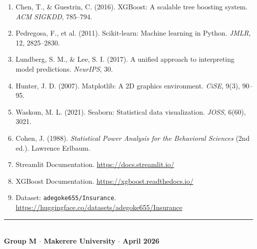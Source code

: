 \documentclass[12pt,a4paper]{report}
\begin{document}
\begin{enumerate}
  \item Chen, T., \& Guestrin, C. (2016). XGBoost: A scalable tree boosting system. \textit{ACM SIGKDD}, 785--794.
  \item Pedregosa, F., et al. (2011). Scikit-learn: Machine learning in Python. \textit{JMLR}, 12, 2825--2830.
  \item Lundberg, S. M., \& Lee, S. I. (2017). A unified approach to interpreting model predictions. \textit{NeurIPS}, 30.
  \item Hunter, J. D. (2007). Matplotlib: A 2D graphics environment. \textit{CiSE}, 9(3), 90--95.
  \item Waskom, M. L. (2021). Seaborn: Statistical data visualization. \textit{JOSS}, 6(60), 3021.
  \item Cohen, J. (1988). \textit{Statistical Power Analysis for the Behavioral Sciences} (2nd ed.). Lawrence Erlbaum.
  \item Streamlit Documentation. \url{https://docs.streamlit.io/}
  \item XGBoost Documentation. \url{https://xgboost.readthedocs.io/}
  \item Dataset: \texttt{adegoke655/Insurance}. \url{https://huggingface.co/datasets/adegoke655/Insurance}
\end{enumerate}

\vspace{0.8cm}
\begin{center}
  \rule{0.6\textwidth}{0.4pt}\\[0.3cm]
  {\color{primary}\large\textbf{Group M $\cdot$ Makerere University $\cdot$ April 2026}}
\end{center}
\end{document}
